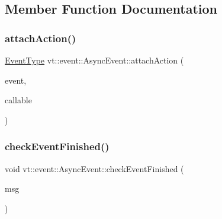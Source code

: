 \subsection{Member Function Documentation}
\mbox{\label{structvt_1_1event_1_1_async_event_aa6432e2fff56eb073f9489bfc37e89bc}} 
\subsubsection{\texorpdfstring{attach\+Action()}{attachAction()}}
{\footnotesize\ttfamily \hyperlink{namespacevt_a009267401def7ae8bf201892222d060f}{Event\+Type} vt\+::event\+::\+Async\+Event\+::attach\+Action (\begin{DoxyParamCaption}\item[{\hyperlink{namespacevt_a009267401def7ae8bf201892222d060f}{Event\+Type} const \&}]{event,  }\item[{\hyperlink{namespacevt_ae0a5a7b18cc99d7b732cb4d44f46b0f3}{Action\+Type}}]{callable }\end{DoxyParamCaption})}

\mbox{\label{structvt_1_1event_1_1_async_event_a5493f4402db0fffba5300246247523b9}} 
\subsubsection{\texorpdfstring{check\+Event\+Finished()}{checkEventFinished()}}
{\footnotesize\ttfamily void vt\+::event\+::\+Async\+Event\+::check\+Event\+Finished (\begin{DoxyParamCaption}\item[{\hyperlink{structvt_1_1_event_check_finished_msg}{Event\+Check\+Finished\+Msg} $\ast$}]{msg }\end{DoxyParamCaption})\hspace{0.3cm}{\ttfamily [static]}}

\mbox{\label{structvt_1_1event_1_1_async_event_abcc9a87b539116f0239686fff07db893}} 
